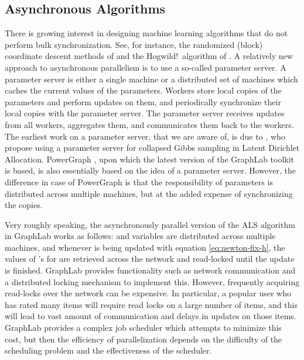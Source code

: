 \documentclass{vldb}
\begin{document}
\subsection{Asynchronous Algorithms}
\label{sec:AsynchrAlgor}

There is growing interest in designing machine learning algorithms that
do not perform bulk synchronization. See, for instance, the randomized
(block) coordinate descent methods of \citet{RicTak13} and the Hogwild!\
algorithm of \citet{RecReWriNiu11}. A relatively new approach to
asynchronous parallelism is to use a so-called parameter server. A
parameter server is either a single machine or a distributed set of
machines which caches the current values of the parameters. Workers
store local copies of the parameters and perform updates on them, and
periodically synchronize their local copies with the parameter
server. The parameter server receives updates from all workers,
aggregates them, and communicates them back to the workers. The earliest
work on a parameter server, that we are aware of, is due to
\citet{SmoNar10}, who propose using a parameter server for collapsed
Gibbs sampling in Latent Dirichlet Allocation. PowerGraph
\citep{GonLowGuBicetal12}, upon which the latest version of the GraphLab
toolkit is based, is also essentially based on the idea of a parameter
server. However, the difference in case of PowerGraph is that the
responsibility of parameters is distributed across multiple machines,
but at the added expense of synchronizing the copies.



Very roughly speaking, the asynchronously parallel version of the ALS
algorithm in GraphLab works as follows:  and  variables
are distributed across multiple machines, and whenever  is being
updated with equation \eqref{eq:newton-fix-h}, the values of 's
for  are retrieved across the network and read-locked
until the update is finished.  GraphLab provides functionality such as
network communication and a distributed locking mechanism to implement
this. However, frequently acquiring read-locks over the network can be
expensive.  In particular, a popular user who has rated many items will
require read locks on a large number of items, and this will lead to
vast amount of communication and delays in updates on those items.
GraphLab provides a complex job scheduler which attempts to minimize
this cost, but then the efficiency of parallelization depends on the
difficulty of the scheduling problem and the effectiveness of the
scheduler. 
\end{document}
